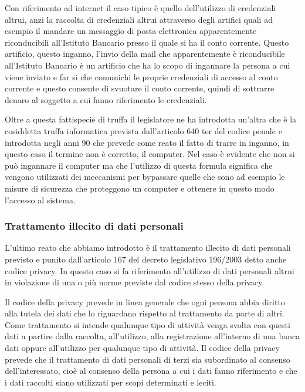 Con riferimento ad internet il caso tipico è quello dell'utilizzo di credenziali altrui, anzi la raccolta di credenziali altrui attraverso degli artifici quali ad esempio il mandare un messaggio di posta elettronica apparentemente riconducibili all'Istituto Bancario presso il quale si ha il conto corrente. Questo artificio, questo inganno, l'invio della mail che apparentemente è riconducibile all'Istituto Bancario è un artificio che ha lo scopo di ingannare la persona a cui viene inviato e far sì che comunichi le proprie credenziali di accesso al conto corrente e questo consente di svuotare il conto corrente, quindi di sottrarre denaro al soggetto a cui fanno riferimento le credenziali.

Oltre a questa fattispecie di truffa il legislatore ne ha introdotta un'altra che è la cosiddetta truffa informatica prevista dall'articolo 640 ter del codice penale e introdotta negli anni 90 che prevede come reato il fatto di trarre in inganno, in questo caso il termine non è corretto, il computer. Nel caso è evidente che non si può ingannare il computer ma che l'utilizzo di questa formula significa che vengono utilizzati dei meccanismi per bypassare quelle che sono ad esempio le misure di sicurezza che proteggono un computer e ottenere in questo modo l'accesso al sistema.

\subsubsection*{Trattamento illecito di dati personali}
L'ultimo reato che abbiamo introdotto è il trattamento illecito di dati personali previsto e punito dall'articolo 167 del decreto legislativo 196/2003 detto anche codice privacy. In questo caso si fa riferimento all'utilizzo di dati personali altrui in violazione di una o più norme previste dal codice stesso della privacy.

Il codice della privacy prevede in linea generale che ogni persona abbia diritto alla tutela dei dati che lo riguardano rispetto al trattamento da parte di altri. Come trattamento si intende qualunque tipo di attività venga svolta con questi dati a partire dalla raccolta, all'utilizzo, alla registrazione all'interno di una banca dati oppure all'utilizzo per qualunque tipo di attività. Il codice della privacy prevede che il trattamento di dati personali di terzi sia subordinato al consenso dell'interessato, cioè al consenso della persona a cui i dati fanno riferimento e che i dati raccolti siano utilizzati per scopi determinati e leciti.

